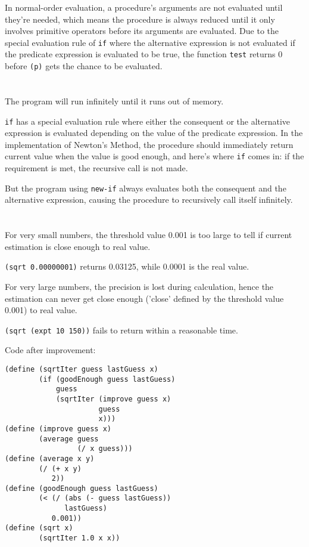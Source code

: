 \documentclass[a4paper]{report}
\begin{document}
In normal-order evaluation, a procedure's arguments are not evaluated until they're needed, which means the procedure is always reduced until it only involves primitive operators before its arguments are evaluated. Due to the special evaluation rule of \lstinline{if} where the alternative expression is not evaluated if the predicate expression is evaluated to be true, the function \lstinline{test} returns 0 before \lstinline{(p)} gets the chance to be evaluated.


\section{}

The program will run infinitely until it runs out of memory.

\lstinline{if} has a special evaluation rule where either the consequent or the alternative expression is evaluated depending on the value of the predicate expression. In the implementation of Newton's Method, the procedure should immediately return current value when the value is good enough, and here's where \lstinline{if} comes in: if the requirement is met, the recursive call is not made.
 
But the program using \lstinline{new-if} always evaluates both the consequent and the alternative expression, causing the procedure to recursively call itself infinitely.


\section{}

For very small numbers, the threshold value 0.001 is too large to tell if current estimation is close enough to real value.

\lstinline{(sqrt 0.00000001)} returns 0.03125, while 0.0001 is the real value.

For very large numbers, the precision is lost during calculation, hence the estimation can never get close enough ('close' defined by the threshold value 0.001) to real value.

\lstinline{(sqrt (expt 10 150))} fails to return within a reasonable time.

Code after improvement:

\begin{lstlisting}
(define (sqrtIter guess lastGuess x)
        (if (goodEnough guess lastGuess)
            guess
            (sqrtIter (improve guess x)
                      guess
                      x)))
(define (improve guess x)
        (average guess
                 (/ x guess)))
(define (average x y)
        (/ (+ x y)
           2))
(define (goodEnough guess lastGuess)
        (< (/ (abs (- guess lastGuess))
              lastGuess)
           0.001))
(define (sqrt x)
        (sqrtIter 1.0 x x))
\end{lstlisting}
\end{document}
